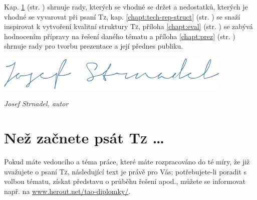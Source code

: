 \documentclass[a4paper,11pt, twoside]{report}
\begin{document}
Kap. 
\ref{chapt:tech-rep-notes}
(str. \pageref{chapt:tech-rep-notes})
shrnuje rady, kterých se vhodné se držet a nedostatků, kterých je vhodné se vyvarovat při psaní \textsc{Tz},
kap.
\ref{chapt:tech-rep-struct}
(str. \pageref{chapt:tech-rep-struct})
se snaží inspirovat k vytvoření kvalitní struktury \textsc{Tz},
příloha
\ref{chapt:eval}
(str. \pageref{chapt:eval})
se zabývá 
hodnocením přípravy na řešení daného tématu
a příloha
\ref{chapt:prez}
(str. \pageref{chapt:prez})
shrnuje rady pro tvorbu prezentace a její přednes publiku.
	

\vspace{4mm}
\flushright
\includegraphics[scale=.35]{my_signature}


\emph{Josef Strnadel, autor}


\vspace{2mm}


\raggedbottom

\pagebreak

\flushleft



\tableofcontents


\thispagestyle{empty}


\raggedbottom

\thispagestyle{fancy}


\pagebreak



\chapter{Než začnete psát \textsc{Tz} \ldots}
\label{chapt:tech-rep-notes}


\thispagestyle{fancy}

\vspace{-4mm} 

Pokud máte 
vedoucího a téma práce, které 
máte rozpracováno do té míry, že již uvažujete o psaní \textsc{Tz},
následující text je právě pro Vás; potřebujete-li poradit s volbou tématu, získat představu o průběhu řešení apod., 
 můžete se informovat např. na 
\url{www.herout.net/tao-diplomky/}.

\quad 

\quad 

\parbox{\textwidth}{
\centering 

\scalebox{2.5}{

\faCheck
}}
\end{document}
